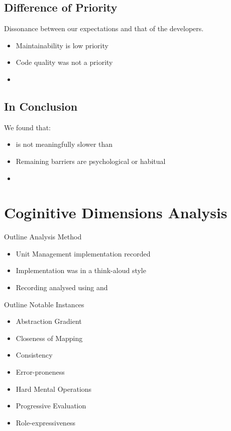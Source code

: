 \subsection{Difference of Priority}
\begin{frame}{\secname}{\subsecname}
	Dissonance between our expectations and that of the developers.
	\begin{itemize}
		\item<2-> Maintainability is low priority
		\item<3-> Code quality was not a priority
		\item<4-> 
	\end{itemize}
\end{frame}

\subsection{In Conclusion}
\begin{frame}{\secname}{\subsecname}
	We found that:
	\begin{itemize}
		\item<2-> \fs is not meaningfully slower than \cs
		\item<3-> Remaining barriers are psychological or habitual
		\item<4-> 
	\end{itemize}
\end{frame}

\section{Coginitive Dimensions Analysis}
\begin{frame}{\secname}{Outline}
	Analysis Method
	\begin{itemize}
		\item Unit Management implementation recorded
		\item Implementation was in a think-aloud style
		\item Recording analysed using \cognitive and \attention
	\end{itemize}
\end{frame}

\begin{frame}{\secname}{Outline}
	Notable Instances
	\begin{itemize}
		\item Abstraction Gradient
		\item Closeness of Mapping
		\item Consistency
		\item Error-proneness
		\item Hard Mental Operations
		\item Progressive Evaluation
		\item Role-expressiveness
	\end{itemize}
\end{frame}

